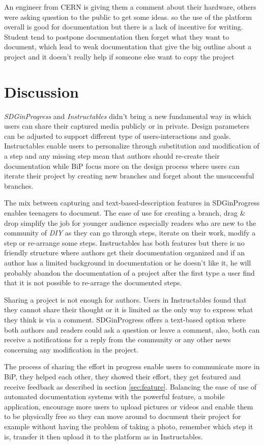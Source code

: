 An engineer from CERN is giving them a comment about their hardware, others were asking question to the public to get some ideas. so the use of the platform overall is good for documentation but there is a lack of incentive for writing. Student tend to postpone documentation then forget what they want to document, which lead to weak documentation that give the big outline about a project and it doesn't really help if someone else want to copy the project






\section{Discussion}

\textit{SDGinProgress} and \textit{Instructables} didn't bring a new fundamental way in which users can share their captured media publicly or in private. Design parameters can be adjusted to support different type of users-interactions and goals.  Instructables enable users to personalize through substitution and modification of a step and any missing step mean that authors should re-create their documentation while BiP focus more on the  design process where users can iterate their project by creating new branches and forget about the unsuccessful branches.

The mix between capturing and text-based-description features in SDGinProgress enables teenagers to document. The ease of use for creating a branch, drag \& drop simplify the job for younger audience especially readers who are new to the community of \textit{DIY} as they can go through steps, iterate on their work, modify a step or re-arrange some steps.  Instructables has both features but there is no friendly structure where authors get their documentation organized and if an author has a limited background in documentation or he doesn't like it, he will probably abandon the documentation of a project after the first type a user find that it is not possible to re-arrage the documented steps.

Sharing a project is not enough for authors. Users in Instructables found that they cannot share their thought or it is limited as the only way to express what they think is via a comment. SDGinProgress offers a text-based option where both authors and readers could ask a question or leave a comment, also, both can receive a notifications for a reply from the community or any other news concerning any modification in the project.

The process of sharing the effort in progress enable users to communicate more in BiP, they helped each other, they showed their effort, they get featured and receive feedback as described in section \ref{sec:feature}. Balancing the ease of use of automated documentation systems with the powerful feature, a mobile application, encourage more users to upload pictures or videos and enable them to be physically free so they can move around to document their project for example without having the problem of taking a photo, remember which step it is, transfer it then upload it to the platform as in Instructables.



